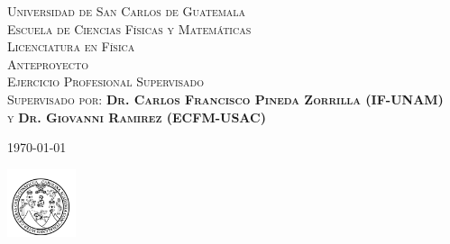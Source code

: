 \documentclass[11pt, spanish, letterpage]{article} %
\begin{document}
\begin{titlepage}
\textsc{\LARGE Universidad de San Carlos de Guatemala\\ Escuela de Ciencias Físicas y Matemáticas\\ Licenciatura en Física}\\[2cm]
\textsc{\huge Anteproyecto}\\
\textsc{\Large Ejercicio Profesional Supervisado}\\[2cm]

\textsc{\Large Supervisado por: \textbf{Dr. Carlos Francisco Pineda Zorrilla (IF-UNAM)} \\ y  \textbf{Dr. Giovanni Ramirez (ECFM-USAC)} }  %
                                                                                                      

\vfill\vfill\vfill %
\vfill\vfill\vfill

{\large \today} %


\includegraphics[width=0.15\textwidth]{Imagenes/0001.jpg}\\[1cm] %


\vfill %
\end{titlepage} %
\end{document}
